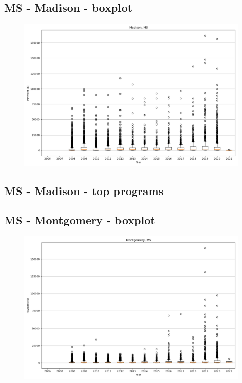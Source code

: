 \subsection*{MS - Madison - boxplot}
\begin{figure}[h]
\centering
\includegraphics[width=7in]{../output/boxplots/counties/Madison-MS_boxplot.png}
\end{figure}


\subsection*{MS - Madison - top programs}

\newpage
\subsection*{MS - Montgomery - boxplot}
\begin{figure}[h]
\centering
\includegraphics[width=7in]{../output/boxplots/counties/Montgomery-MS_boxplot.png}
\end{figure}


